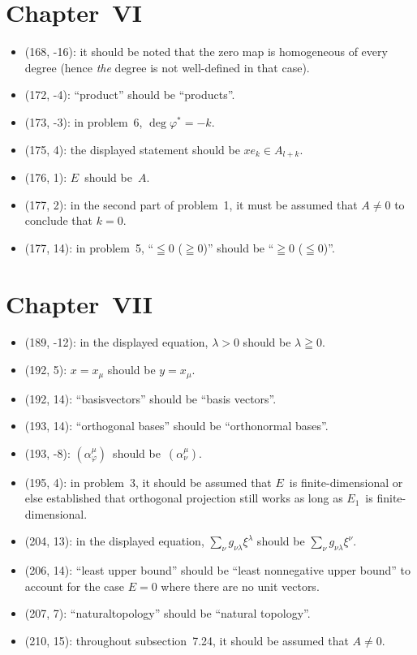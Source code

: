 \documentclass[letterpaper,12pt]{article}
\begin{document}
\section*{Chapter~VI}
\begin{itemize}
\item (168, -16): it should be noted that the zero map is homogeneous of every degree (hence \emph{the} degree is not well-defined in that case).
\item (172, -4): ``product'' should be ``products''.
\item (173, -3): in problem~6, \(\deg\varphi^*=-k\).
\item (175, 4): the displayed statement should be \(xe_k\in A_{l+k}\).
\item (176, 1): \(E\)~should be~\(A\).
\item (177, 2): in the second part of problem~1, it must be assumed that \(A\ne 0\) to conclude that \(k=0\).
\item (177, 14): in problem~5, ``\(\leqq 0\) (\(\geqq 0\))'' should be ``\(\geqq 0\) (\(\leqq 0\))''.
\end{itemize}

\section*{Chapter~VII}
\begin{itemize}
\item (189, -12): in the displayed equation, \(\lambda>0\) should be \(\lambda\geqq 0\).
\item (192, 5): \(x=x_{\mu}\) should be \(y=x_{\mu}\).
\item (192, 14): ``basisvectors'' should be ``basis vectors''.
\item (193, 14): ``orthogonal bases'' should be ``orthonormal bases''.
\item (193, -8): \((\alpha^{\mu}_{\varphi})\)~should be~\((\alpha^{\mu}_{\nu})\).
\item (195, 4): in problem~3, it should be assumed that \(E\)~is finite-dimensional or else established that orthogonal projection still works as long as \(E_1\)~is finite-dimensional.
\item (204, 13): in the displayed equation, \(\sum_{\nu}g_{\nu\lambda}\xi^{\lambda}\) should be \(\sum_{\nu}g_{\nu\lambda}\xi^{\nu}\).
\item (206, 14): ``least upper bound'' should be ``least nonnegative upper bound'' to account for the case \(E=0\) where there are no unit vectors.
\item (207, 7): ``naturaltopology'' should be ``natural topology''.
\item (210, 15): throughout subsection~7.24, it should be assumed that \(A\ne 0\).
\end{itemize}
\end{document}
